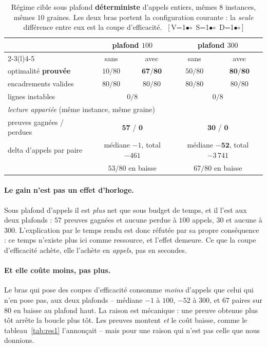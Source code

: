 \documentclass[11pt,a4paper]{article}
\theoremstyle{plain}
\theoremstyle{remark}
\newcommand{\cfgm}[1]{\ifnum#1=1$\bullet$\else$\circ$\fi}
\newcommand{\conf}[3]{%
  \textsf{\footnotesize[\,V\cfgm{#1}\ S\cfgm{#2}\ D\cfgm{#3}\,]}}
\begin{document}
\begin{table}[H]
\centering
\caption{Régime cible sous plafond \textbf{déterministe} d'appels entiers,
mêmes $8$ instances, mêmes $10$ graines. Les deux bras portent la
configuration courante : la \emph{seule} différence entre eux est la coupe
d'efficacité.\ \conf{1}{1}{1}}
\label{tab:cibledeterm}
\setlength{\tabcolsep}{5pt}
\begin{tabular}{lcccc}
\toprule
& \multicolumn{2}{c}{plafond $100$} & \multicolumn{2}{c}{plafond $300$}\\
\cmidrule(lr){2-3}\cmidrule(l){4-5}
& sans & avec & sans & avec\\
\midrule
optimalité \textbf{prouvée} & $10/80$ & $\mathbf{67/80}$
                            & $50/80$ & $\mathbf{80/80}$\\
encadrements valides & $80/80$ & $80/80$ & $80/80$ & $80/80$\\
lignes instables & \multicolumn{2}{c}{$0/8$} & \multicolumn{2}{c}{$0/8$}\\
\midrule
\multicolumn{5}{l}{\emph{lecture appariée} (même instance, même graine)}\\
preuves gagnées / perdues & \multicolumn{2}{c}{$\mathbf{57}$ / $\mathbf{0}$}
                          & \multicolumn{2}{c}{$\mathbf{30}$ / $\mathbf{0}$}\\
delta d'appels par paire & \multicolumn{2}{c}{médiane $-1$, total $-461$}
                         & \multicolumn{2}{c}{médiane $\mathbf{-52}$,
                           total $-3\,741$}\\
& \multicolumn{2}{c}{$53/80$ en baisse}
& \multicolumn{2}{c}{$67/80$ en baisse}\\
\bottomrule
\end{tabular}
\end{table}

\paragraph{Le gain n'est pas un effet d'horloge.} Sous plafond d'appels il
est \emph{plus} net que sous budget de temps, et il l'est aux deux plafonds :
$57$ preuves gagnées et aucune perdue à $100$ appels, $30$ et aucune à
$300$. L'explication par le temps rendu est donc réfutée par sa propre
conséquence : ce temps n'existe plus ici comme ressource, et l'effet
demeure. Ce que la coupe d'efficacité achète, elle l'achète en \emph{appels},
pas en secondes.

\paragraph{Et elle coûte moins, pas plus.} Le bras qui pose des coupes
d'efficacité consomme \emph{moins} d'appels que celui qui n'en pose pas, aux
deux plafonds -- médiane $-1$ à $100$, $-52$ à $300$, et $67$ paires sur $80$
en baisse au plafond haut. La raison est mécanique : une preuve obtenue plus
tôt arrête la boucle plus tôt. Les preuves montent \emph{et} le coût baisse,
comme le tableau~\ref{tab:res1} l'annonçait -- mais pour une raison qui
n'est pas celle que nous donnions.
\end{document}
